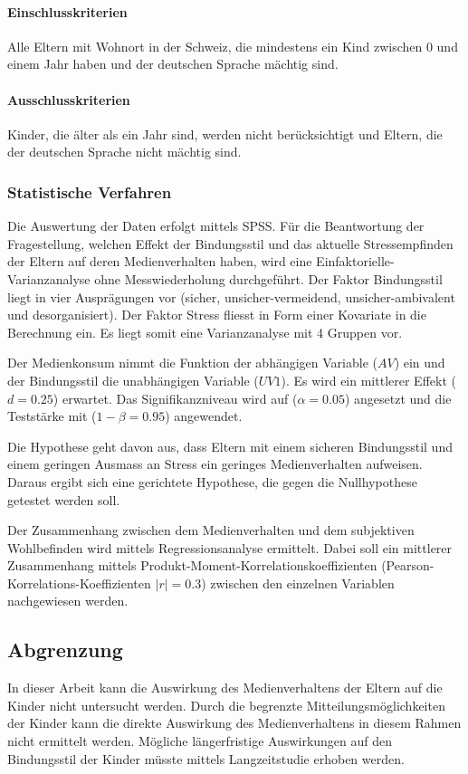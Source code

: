 \paragraph{Einschlusskriterien}
Alle Eltern mit Wohnort in der Schweiz, die mindestens ein Kind zwischen 0 und einem Jahr haben und der deutschen Sprache mächtig sind.
\paragraph{Ausschlusskriterien}
Kinder, die älter als ein Jahr sind, werden nicht berücksichtigt und Eltern, die der deutschen Sprache nicht mächtig sind.
\subsubsection{Statistische Verfahren}
Die Auswertung der Daten erfolgt mittels SPSS. 
Für die Beantwortung der Fragestellung, welchen Effekt der Bindungsstil und das aktuelle Stressempfinden der Eltern auf deren Medienverhalten haben, wird eine Einfaktorielle-Varianzanalyse ohne Messwiederholung durchgeführt. Der Faktor Bindungsstil liegt in vier Ausprägungen vor (sicher, unsicher-vermeidend, unsicher-ambivalent und desorganisiert). Der Faktor Stress fliesst in Form einer Kovariate in die Berechnung ein. Es liegt somit eine Varianzanalyse mit 4 Gruppen vor. 

Der Medienkonsum nimmt die Funktion der abhängigen Variable ($AV$) ein und der Bindungsstil die unabhängigen Variable ($UV1$). Es wird ein mittlerer Effekt ($d=0.25$) erwartet. Das Signifikanzniveau wird auf ($\alpha=0.05$) angesetzt und die Teststärke mit ($1-\beta=0.95$) angewendet.

Die Hypothese geht davon aus, dass Eltern mit einem sicheren Bindungsstil und einem geringen Ausmass an Stress ein geringes Medienverhalten aufweisen. Daraus ergibt sich eine gerichtete Hypothese, die gegen die Nullhypothese getestet werden soll.

Der Zusammenhang zwischen dem Medienverhalten und dem subjektiven Wohlbefinden wird mittels Regressionsanalyse ermittelt. Dabei soll ein mittlerer Zusammenhang mittels Produkt-Moment-Korrelationskoeffizienten (Pearson-Korrelations-Koeffizienten $|r|=0.3$) zwischen den einzelnen Variablen nachgewiesen werden.

\subsection{Abgrenzung}
In dieser Arbeit kann die Auswirkung des Medienverhaltens der Eltern auf die Kinder nicht untersucht werden. Durch die begrenzte Mitteilungsmöglichkeiten der Kinder kann die direkte Auswirkung des Medienverhaltens in diesem Rahmen nicht ermittelt werden. Mögliche längerfristige Auswirkungen auf den Bindungsstil der Kinder müsste mittels Langzeitstudie erhoben werden. 
